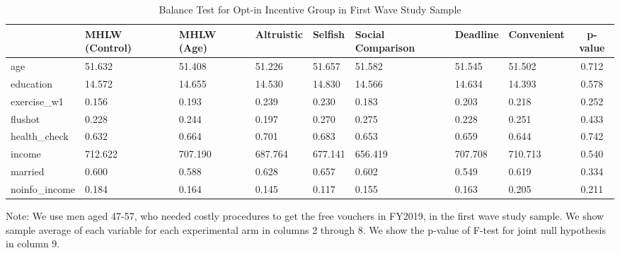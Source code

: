 \begin{table}[!h]

\caption{Balance Test for Opt-in Incentive Group in First Wave Study Sample \label{tab:int-coupon0-balance}}
\centering
\fontsize{9}{11}\selectfont
\begin{threeparttable}
\begin{tabular}[t]{l>{\centering\arraybackslash}p{3em}>{\centering\arraybackslash}p{3em}>{\centering\arraybackslash}p{3em}>{\centering\arraybackslash}p{3em}>{\centering\arraybackslash}p{3em}>{\centering\arraybackslash}p{3em}>{\centering\arraybackslash}p{3em}c}
\toprule
  & MHLW (Control) & MHLW (Age) & Altruistic & Selfish & Social Comparison & Deadline & Convenient & p-value\\
\midrule
age & \num{51.632} & \num{51.408} & \num{51.226} & \num{51.657} & \num{51.582} & \num{51.545} & \num{51.502} & \num{0.712}\\
education & \num{14.572} & \num{14.655} & \num{14.530} & \num{14.830} & \num{14.566} & \num{14.634} & \num{14.393} & \num{0.578}\\
exercise\_w1 & \num{0.156} & \num{0.193} & \num{0.239} & \num{0.230} & \num{0.183} & \num{0.203} & \num{0.218} & \num{0.252}\\
flushot & \num{0.228} & \num{0.244} & \num{0.197} & \num{0.270} & \num{0.275} & \num{0.228} & \num{0.251} & \num{0.433}\\
health\_check & \num{0.632} & \num{0.664} & \num{0.701} & \num{0.683} & \num{0.653} & \num{0.659} & \num{0.644} & \num{0.742}\\
income & \num{712.622} & \num{707.190} & \num{687.764} & \num{677.141} & \num{656.419} & \num{707.708} & \num{710.713} & \num{0.540}\\
married & \num{0.600} & \num{0.588} & \num{0.628} & \num{0.657} & \num{0.602} & \num{0.549} & \num{0.619} & \num{0.334}\\
noinfo\_income & \num{0.184} & \num{0.164} & \num{0.145} & \num{0.117} & \num{0.155} & \num{0.163} & \num{0.205} & \num{0.211}\\
\bottomrule
\end{tabular}
\begin{tablenotes}
\item Note: We use men aged 47-57, who needed costly procedures to get the free vouchers in FY2019, in the first wave study sample. We show sample average of each variable for each experimental arm in columns 2 through 8. We show the p-value of F-test for joint null hypothesis in column 9.
\end{tablenotes}
\end{threeparttable}
\end{table}
